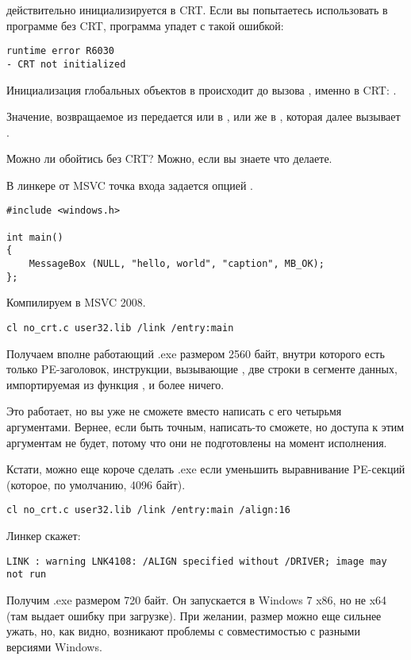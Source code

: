  действительно инициализируется в \ac{CRT}.
Если вы попытаетесь использовать  в программе без CRT, программа упадет с такой ошибкой:

\begin{lstlisting}
runtime error R6030
- CRT not initialized
\end{lstlisting}

Инициализация глобальных объектов в \Cpp происходит до вызова \main{}, именно в \ac{CRT}: 
.

Значение, возвращаемое из \main{} передается или в , 
или же в , которая далее вызывает .

Можно ли обойтись без \ac{CRT}? Можно, если вы знаете что делаете.

В линкере от \ac{MSVC} точка входа задается опцией .

\begin{lstlisting}[style=customc]
#include <windows.h>

int main()
{
	MessageBox (NULL, "hello, world", "caption", MB_OK);
};
\end{lstlisting}

Компилируем в MSVC 2008.

\begin{lstlisting}
cl no_crt.c user32.lib /link /entry:main
\end{lstlisting}

Получаем вполне работающий .exe размером 2560 байт, внутри которого есть только PE-заголовок, инструкции, 
вызывающие ,
две строки в сегменте данных, импортируемая из  функция , и более ничего.

Это работает, но вы уже не сможете вместо \main{} написать  с его четырьмя аргументами.
Вернее, если быть точным, написать-то сможете, но доступа к этим аргументам не будет, 
потому что они не подготовлены на момент исполнения.

Кстати, можно еще короче сделать .exe если уменьшить 
выравнивание \ac{PE}-секций (которое, по умолчанию, 4096 байт).

\begin{lstlisting}
cl no_crt.c user32.lib /link /entry:main /align:16
\end{lstlisting}

Линкер скажет:

\begin{lstlisting}
LINK : warning LNK4108: /ALIGN specified without /DRIVER; image may not run
\end{lstlisting}

Получим .exe размером 720 байт.
Он запускается в Windows 7 x86, но не x64 
(там выдает ошибку при загрузке).
При желании, размер можно еще сильнее ужать, но, как видно, 
возникают проблемы с совместимостью с разными версиями Windows.

